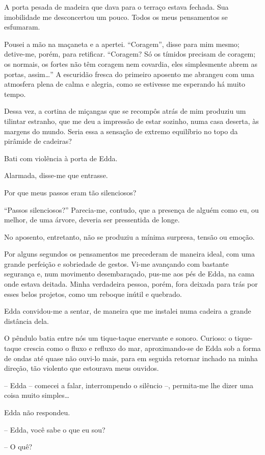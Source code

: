 A porta pesada de madeira que dava para o terraço estava fechada. Sua imobilidade me desconcertou um pouco. Todos os meus pensamentos se esfumaram.

Pousei a mão na maçaneta e a apertei. ``Coragem'', disse para mim mesmo; detive-me, porém, para retificar. ``Coragem? Só os tímidos precisam de coragem; os normais, os fortes não têm coragem nem covardia, eles simplesmente abrem as portas, assim\dots''
A escuridão fresca do primeiro aposento me abrangeu com uma atmosfera plena de calma e alegria, como se estivesse me esperando há muito tempo.

Dessa vez, a cortina de miçangas que se recompôs atrás de mim produziu um tilintar estranho, que me deu a impressão de estar sozinho, numa casa deserta, às margens do mundo. Seria essa a sensação de extremo equilíbrio no topo da pirâmide de cadeiras?

Bati com violência à porta de Edda.

Alarmada, disse-me que entrasse.

Por que meus passos eram tão silenciosos?

``Passos silenciosos?'' Parecia-me, contudo, que a presença de alguém como eu, ou melhor, de uma árvore, deveria ser pressentida de longe.

No aposento, entretanto, não se produziu a mínima surpresa, tensão ou emoção.

Por alguns segundos os pensamentos me precederam de maneira ideal, com uma grande perfeição e sobriedade de gestos. Vi-me avançando com bastante segurança e, num movimento desembaraçado, pus-me aos pés de Edda, na cama onde estava deitada. Minha verdadeira pessoa, porém, fora deixada para trás por esses belos projetos, como um reboque inútil e quebrado.

Edda convidou-me a sentar, de maneira que me instalei numa cadeira a grande distância dela.

O pêndulo batia entre nós um tique-taque enervante e sonoro. Curioso: o tique-taque crescia como o fluxo e refluxo do mar, aproximando-se de Edda sob a forma de ondas até quase não ouvi-lo mais, para em seguida retornar inchado na minha direção, tão violento que estourava meus ouvidos.

-- Edda -- comecei a falar, interrompendo o silêncio --, permita-me lhe dizer uma coisa muito simples\dots

Edda não respondeu.

-- Edda, você sabe o que eu sou?

-- O quê?

